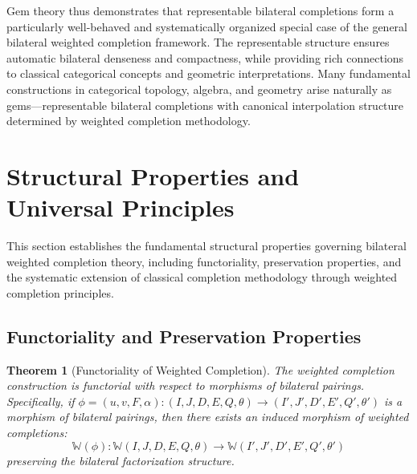 \documentclass[11pt]{article}
\theoremstyle{plain}
\newtheorem{theorem}{Theorem}[section]
\theoremstyle{definition}
\theoremstyle{remark}
\begin{document}
Gem theory thus demonstrates that representable bilateral completions form a particularly well-behaved and systematically organized special case of the general bilateral weighted completion framework. The representable structure ensures automatic bilateral denseness and compactness, while providing rich connections to classical categorical concepts and geometric interpretations. Many fundamental constructions in categorical topology, algebra, and geometry arise naturally as gems—representable bilateral completions with canonical interpolation structure determined by weighted completion methodology.

\section{Structural Properties and Universal Principles}

This section establishes the fundamental structural properties governing bilateral weighted completion theory, including functoriality, preservation properties, and the systematic extension of classical completion methodology through weighted completion principles.

\subsection{Functoriality and Preservation Properties}

\begin{theorem}[Functoriality of Weighted Completion]\label{thm:completion-functorial}
The weighted completion construction is functorial with respect to morphisms of bilateral pairings. Specifically, if $\phi = (u, v, F, \alpha) : (I, J, D, E, Q, \theta) \to (I', J', D', E', Q', \theta')$ is a morphism of bilateral pairings, then there exists an induced morphism of weighted completions:
$$\mathbb{W}(\phi) : \mathbb{W}(I, J, D, E, Q, \theta) \to \mathbb{W}(I', J', D', E', Q', \theta')$$
preserving the bilateral factorization structure.
\end{theorem}
\end{document}
